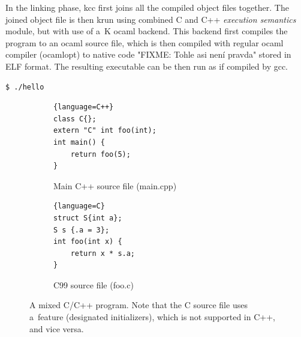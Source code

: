 \documentclass{fithesis3}
\begin{document}
In the linking phase, kcc first joins all the compiled object files together. The joined object file is then krun using combined C and C++ \textit{execution semantics} module, but with use of a~K ocaml backend. This backend first compiles the program to an ocaml source file, which is then compiled with regular ocaml compiler (ocamlopt) to native code "FIXME: Tohle asi není pravda" stored in ELF format. The resulting executable can be then run as if compiled by gcc.

\begin{lstlisting}[language=bash]
$ ./hello
\end{lstlisting}






\begin{figure}
\centering
\begin{subfigure}{.5\textwidth}
  \centering

\begin{lstlisting}{language=C++}
class C{};
extern "C" int foo(int);
int main() {
	return foo(5);
}
\end{lstlisting}

  \caption{Main C++ source file (main.cpp)}
\end{subfigure}%
\begin{subfigure}{.5\textwidth}
  \centering
\begin{lstlisting}{language=C}
struct S{int a};
S s {.a = 3};
int foo(int x) {
	return x * s.a;
}
\end{lstlisting}
  \caption{C99 source file (foo.c)}
\end{subfigure}
\caption{A mixed C/C++ program. Note that the C source file uses a~feature (designated initializers), which is not supported in C++, and vice versa.}
\label{fig:cpp-program-example}
\end{figure}
\end{document}
